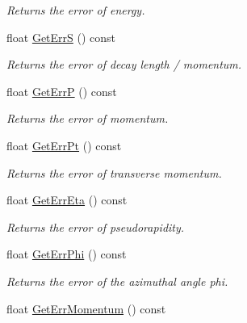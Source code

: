 \begin{DoxyCompactItemize}
\begin{DoxyCompactList}\small\item\em Returns the error of energy. \end{DoxyCompactList}\item 
float \hyperlink{classKFParticle_a517852a4d166a004343c9e2b64310115}{Get\+ErrS} () const \hypertarget{classKFParticle_a517852a4d166a004343c9e2b64310115}{}\label{classKFParticle_a517852a4d166a004343c9e2b64310115}

\begin{DoxyCompactList}\small\item\em Returns the error of decay length / momentum. \end{DoxyCompactList}\item 
float \hyperlink{classKFParticle_a1f9c64d313d84e688945d119de4024a0}{Get\+ErrP} () const \hypertarget{classKFParticle_a1f9c64d313d84e688945d119de4024a0}{}\label{classKFParticle_a1f9c64d313d84e688945d119de4024a0}

\begin{DoxyCompactList}\small\item\em Returns the error of momentum. \end{DoxyCompactList}\item 
float \hyperlink{classKFParticle_a2521f48c4ee6207b31af48a72fbe1598}{Get\+Err\+Pt} () const \hypertarget{classKFParticle_a2521f48c4ee6207b31af48a72fbe1598}{}\label{classKFParticle_a2521f48c4ee6207b31af48a72fbe1598}

\begin{DoxyCompactList}\small\item\em Returns the error of transverse momentum. \end{DoxyCompactList}\item 
float \hyperlink{classKFParticle_a6e91734dc4f0c0edac14d43f8bf9ffd5}{Get\+Err\+Eta} () const \hypertarget{classKFParticle_a6e91734dc4f0c0edac14d43f8bf9ffd5}{}\label{classKFParticle_a6e91734dc4f0c0edac14d43f8bf9ffd5}

\begin{DoxyCompactList}\small\item\em Returns the error of pseudorapidity. \end{DoxyCompactList}\item 
float \hyperlink{classKFParticle_a8ad31ee7426a8e5e7c7006e1880707be}{Get\+Err\+Phi} () const \hypertarget{classKFParticle_a8ad31ee7426a8e5e7c7006e1880707be}{}\label{classKFParticle_a8ad31ee7426a8e5e7c7006e1880707be}

\begin{DoxyCompactList}\small\item\em Returns the error of the azimuthal angle phi. \end{DoxyCompactList}\item 
float \hyperlink{classKFParticle_ad635dc5751c6d86728cb26a6ac5f2a01}{Get\+Err\+Momentum} () const \hypertarget{classKFParticle_ad635dc5751c6d86728cb26a6ac5f2a01}{}\label{classKFParticle_ad635dc5751c6d86728cb26a6ac5f2a01}


\end{DoxyCompactItemize}

